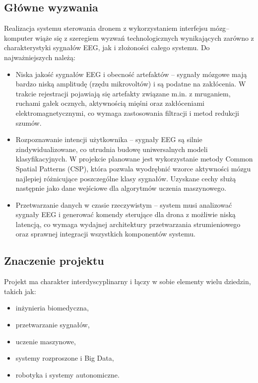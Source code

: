 \subsection{Główne wyzwania}
Realizacja systemu sterowania dronem z wykorzystaniem interfejsu mózg–komputer wiąże się z szeregiem wyzwań technologicznych wynikających zarówno z charakterystyki sygnałów EEG, jak i złożoności całego systemu. Do najważniejszych należą:

\begin{itemize}
    \item Niska jakość sygnałów EEG i obecność artefaktów – sygnały mózgowe mają bardzo niską amplitudę (rzędu mikrovoltów) i są podatne na zakłócenia. W trakcie rejestracji pojawiają się artefakty związane m.in. z mruganiem, ruchami gałek ocznych, aktywnością mięśni oraz zakłóceniami elektromagnetycznymi, co wymaga zastosowania filtracji i metod redukcji szumów.
    \item Rozpoznawanie intencji użytkownika – sygnały EEG są silnie zindywidualizowane, co utrudnia budowę uniwersalnych modeli klasyfikacyjnych. W projekcie planowane jest wykorzystanie metody Common Spatial Patterns (CSP), która pozwala wyodrębnić wzorce aktywności mózgu najlepiej różnicujące poszczególne klasy sygnałów. Uzyskane cechy służą następnie jako dane wejściowe dla algorytmów uczenia maszynowego. 
    \item Przetwarzanie danych w czasie rzeczywistym – system musi analizować sygnały EEG i generować komendy sterujące dla drona z możliwie niską latencją, co wymaga wydajnej architektury przetwarzania strumieniowego oraz sprawnej integracji wszystkich komponentów systemu.
\end{itemize}
\subsection{Znaczenie projektu}
Projekt ma charakter interdyscyplinarny i łączy w sobie elementy wielu dziedzin, takich jak:
\begin{itemize}
    \item inżynieria biomedyczna,
    \item przetwarzanie sygnałów,
    \item uczenie maszynowe,
    \item systemy rozproszone i Big Data,
    \item robotyka i systemy autonomiczne.
\end{itemize}
